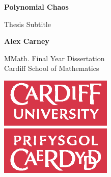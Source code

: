 \begin{titlepage}
    \begin{center}
        \vspace*{5cm}

        \textbf{Polynomial Chaos}

        \vspace{0.5cm}
        Thesis Subtitle

        \vspace{1.5cm}

        \textbf{Alex Carney}

        \vfill

        MMath. Final Year Dissertation\\

        \vspace{0.5cm}
        Cardiff School of Mathematics

        \vspace{1.5cm}

        \includegraphics[width=0.4\textwidth]{img/universitylogo.eps}


    \end{center}
\end{titlepage}
